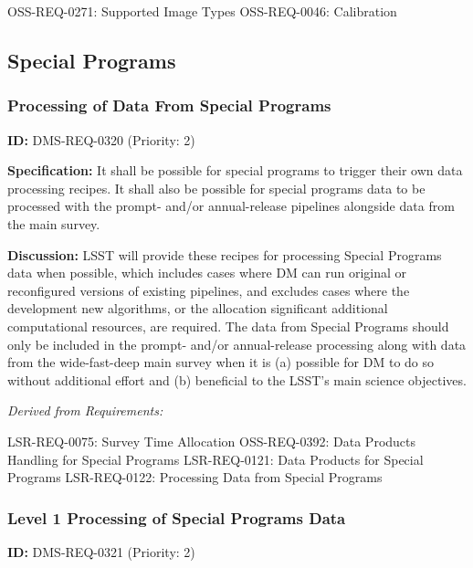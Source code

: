 \documentclass[SE,toc,lsstdraft]{lsstdoc}
\begin{document}
OSS-REQ-0271:
Supported Image Types \newline
OSS-REQ-0046:
Calibration \newline

\subsection{Special Programs}

\subsubsection{Processing of Data From Special Programs}

\label{DMS-REQ-0320}
\textbf{ID:} DMS-REQ-0320 (Priority: 2)

\textbf{Specification:}
It shall be possible for special programs to trigger their own data processing recipes. It shall also be possible for special programs data to be processed with the prompt- and/or annual-release pipelines alongside data from the main survey.

\textbf{Discussion:}
LSST will provide these recipes for processing Special Programs data when possible, which includes cases where DM can run original or reconfigured versions of existing pipelines, and excludes cases where the development new algorithms, or the allocation significant additional computational resources, are required. The data from Special Programs should only be included in the prompt- and/or annual-release processing along with data from the wide-fast-deep main survey when it is (a) possible for DM to do so without additional effort and (b) beneficial to the LSST's main science objectives.

\emph{Derived from Requirements:}

LSR-REQ-0075:
Survey Time Allocation \newline
OSS-REQ-0392:
Data Products Handling for Special Programs \newline
LSR-REQ-0121:
Data Products for Special Programs \newline
LSR-REQ-0122:
Processing Data from Special Programs \newline

\subsubsection{Level 1 Processing of Special Programs Data}

\label{DMS-REQ-0321}
\textbf{ID:} DMS-REQ-0321 (Priority: 2)
\end{document}
